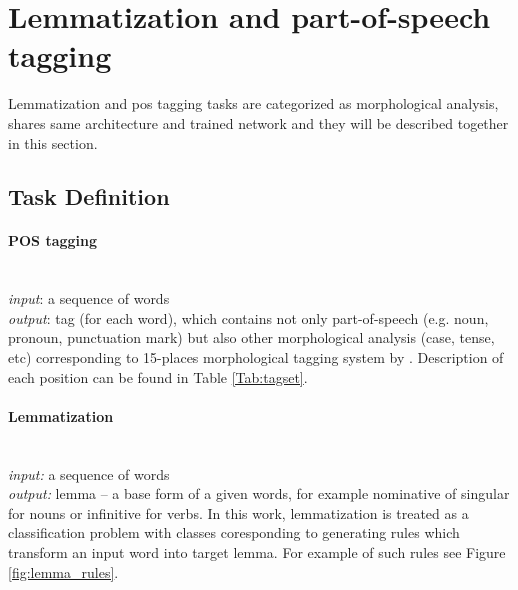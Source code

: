 \section{Lemmatization and part-of-speech tagging}
\label{chap:tag}
Lemmatization and \acrlong{pos} tagging tasks are categorized as morphological analysis, shares same architecture and trained network and they will be described together in this section.
\subsection{Task Definition}

\paragraph{\textbf{POS tagging}} \mbox{}\\
\textit{input}: a sequence of  words \\
\textit{output}: tag (for each word), which contains not only part-of-speech (e.g. noun, pronoun, punctuation mark) but also other morphological analysis (case, tense, etc) corresponding to 15-places morphological tagging system by \cite{Hajic2004}. Description of each position can be found in Table \ref{Tab:tagset}.

\paragraph{\textbf{Lemmatization}} \mbox{}\\
\textit{input:} a sequence of words \\
\textit{output:} lemma -- a base form of a given words, for example nominative of singular for nouns or infinitive for verbs. In this work, lemmatization is treated as a classification problem with classes coresponding to generating rules which transform an input word into target lemma. For example of such rules see Figure \ref{fig:lemma_rules}. \\

